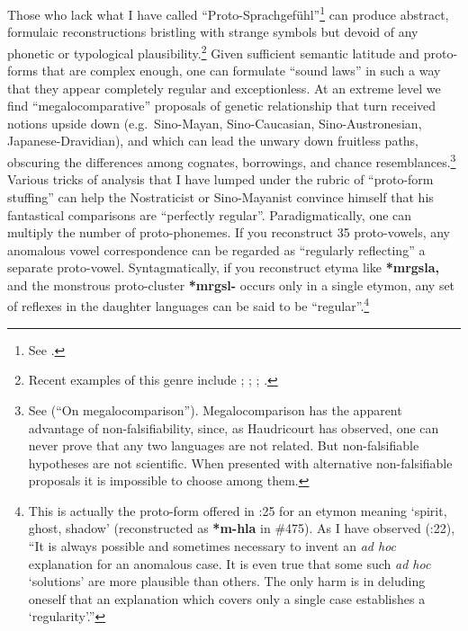 Those who lack what I have called “Proto-Sprachgefühl”\footnote{See
\citealt{JAM-PLPS}.} can produce abstract, formulaic reconstructions bristling with
strange symbols but devoid of any phonetic or typological
plausibility.\footnote{Recent examples of this genre include \citealt{KS-DGST};
\citealt{AW-CALP,AW-STLR,AW-SMS,AW-TBT}; \citealt{PS-STL}; \citealt{LS-ROCU}.} 
Given sufficient semantic latitude and proto-forms that are complex enough, one
can formulate “sound laws” in such a way that they appear completely regular and
exceptionless. At an extreme level we find “megalocomparative” proposals of
genetic relationship that turn received notions upside down (e.g.\ Sino-Mayan,
Sino-Caucasian, Sino-Austronesian, Japanese-Dravidian), and which can lead the
unwary down fruitless paths, obscuring the differences among cognates,
borrowings, and chance resemblances.\footnote{See \citealt{JAM-OM} (“On
megalocomparison”). Megalocomparison has the apparent advantage of
non-falsifiability, since, as Haudricourt has observed, one can never prove that
any two languages are not related. But non-falsifiable hypotheses are not
scientific. When presented with alternative non-falsifiable proposals it is
impossible to choose among them.} Various tricks of analysis that I have lumped
under the rubric of “proto-form stuffing” can help the Nostraticist or
Sino-Mayanist convince himself that his fantastical comparisons are “perfectly
regular”. Paradigmatically, one can multiply the number of proto-phonemes. If
you reconstruct 35 proto-vowels, any anomalous vowel correspondence can be
regarded as “regularly reflecting” a separate proto-vowel. Syntagmatically, if
you reconstruct etyma like \textbf{*mrgsla,} and the monstrous proto-cluster
\textbf{*mrgsl-}
occurs only in a single etymon, any set of reflexes in the daughter languages
can be said to be “regular”.\footnote{This is actually the proto-form offered
in \citealt{AW-SMS}:25 for an etymon meaning ‘spirit, ghost, shadow’ (reconstructed
as \textbf{*m-hla} in \textit{} \#475). As I have observed (\citealt{JAM-PLPS}:22), “It is always
possible and sometimes necessary to invent an \textit{ad hoc} explanation for an
anomalous case. It is even true that some such \textit{ad hoc} ‘solutions’ are more
plausible than others. The only harm is in deluding oneself that an explanation
which covers only a single case establishes a ‘regularity’.”}


